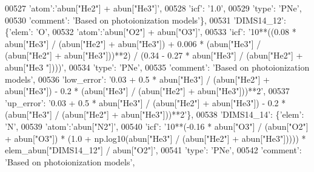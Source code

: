 \begin{DoxyCode}
00527                                        \textcolor{stringliteral}{'atom'}:\textcolor{stringliteral}{'abun["He2"] + abun["He3"]'}, 
00528                                        \textcolor{stringliteral}{'icf'}: \textcolor{stringliteral}{'1.0'},
00529                                        \textcolor{stringliteral}{'type'}: \textcolor{stringliteral}{'PNe'},
00530                                        \textcolor{stringliteral}{'comment'}: \textcolor{stringliteral}{'Based on photoionization models'}\},
00531                          \textcolor{stringliteral}{'DIMS14\_12'}: \{\textcolor{stringliteral}{'elem'}: \textcolor{stringliteral}{'O'},
00532                                        \textcolor{stringliteral}{'atom'}:\textcolor{stringliteral}{'abun["O2"] + abun["O3"]'}, 
00533                                        \textcolor{stringliteral}{'icf'}: \textcolor{stringliteral}{'10**((0.08 * abun["He3"] / (abun["He2"] + abun["He3"]) +
       0.006 * (abun["He3"] / (abun["He2"] + abun["He3"]))**2) / (0.34 - 0.27 * abun["He3"] / (abun["He2"] + abun["He3
      "])))'},
00534                                        \textcolor{stringliteral}{'type'}: \textcolor{stringliteral}{'PNe'},
00535                                        \textcolor{stringliteral}{'comment'}: \textcolor{stringliteral}{'Based on photoionization models'},
00536                                        \textcolor{stringliteral}{'low\_error'}: \textcolor{stringliteral}{'0.03 + 0.5 * abun["He3"] / (abun["He2"] + abun["He3"])
       - 0.2 * (abun["He3"] / (abun["He2"] + abun["He3"]))**2'},
00537                                        \textcolor{stringliteral}{'up\_error'}: \textcolor{stringliteral}{'0.03 + 0.5 * abun["He3"] / (abun["He2"] + abun["He3"])
       - 0.2 * (abun["He3"] / (abun["He2"] + abun["He3"]))**2'}\},
00538                          \textcolor{stringliteral}{'DIMS14\_14'}: \{\textcolor{stringliteral}{'elem'}: \textcolor{stringliteral}{'N'},
00539                                        \textcolor{stringliteral}{'atom'}:\textcolor{stringliteral}{'abun["N2"]'}, 
00540                                        \textcolor{stringliteral}{'icf'}: \textcolor{stringliteral}{'10**(-0.16 * abun["O3"] / (abun["O2"] + abun["O3"]) * (1.0 +
       np.log10(abun["He3"] / (abun["He2"] + abun["He3"])))) * elem\_abun["DIMS14\_12"] / abun["O2"]'},
00541                                        \textcolor{stringliteral}{'type'}: \textcolor{stringliteral}{'PNe'},
00542                                        \textcolor{stringliteral}{'comment'}: \textcolor{stringliteral}{'Based on photoionization models'},

\end{DoxyCode}
